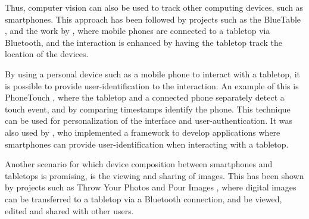 Thus, computer vision can also be used to track other computing devices, such as smartphones.
This approach has been followed by projects such as the BlueTable \citep{Wilson:2007:bluetable}, and the work by \cite{Echtler:2008:tracking}, where mobile phones are connected to a tabletop via Bluetooth, and the interaction is enhanced by having the tabletop track the location of the devices.

By using a personal device such as a mobile phone to interact with a tabletop, it is possible to provide user-identification to the interaction.
An example of this is PhoneTouch \citep{Schmidt:2010:phonetouch}, where the tabletop and a connected phone separately detect a touch event, and by comparing timestamps identify the phone.
This technique can be used for personalization of the interface and user-authentication.
It was also used by \cite{Berglund:2011:nai}, who implemented a framework to develop applications where smartphones can provide user-identification when interacting with a tabletop.

Another scenario for which device composition between smartphones and tabletops is promising, is the viewing and sharing of images.
This has been shown by projects such as Throw Your Photos \citep{Chehimi:2010:throwphotos} and Pour Images \citep{Esbensen:2010:pourimages}, where digital images can be transferred to a tabletop via a Bluetooth connection, and be viewed, edited and shared with other users.

%



